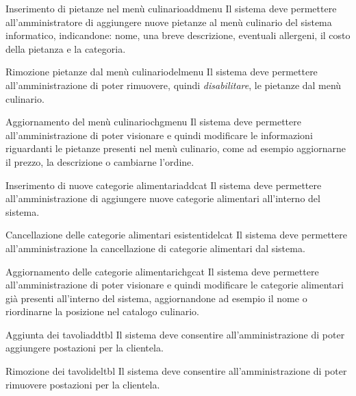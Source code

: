 	\begin{reqfr}{Inserimento di pietanze nel menù culinario}{addmenu}
		Il sistema deve permettere all'amministratore di aggiungere nuove pietanze al menù culinario del sistema informatico, indicandone: nome, una breve descrizione, eventuali allergeni, il costo della pietanza e la categoria.
	\end{reqfr}

	\begin{reqfr}{Rimozione pietanze dal menù culinario}{delmenu}
		Il sistema deve permettere all'amministrazione di poter rimuovere, quindi \textit{disabilitare}, le pietanze dal menù culinario.
	\end{reqfr}

	\begin{reqfr}{Aggiornamento del menù culinario}{chgmenu}
		Il sistema deve permettere all'amministrazione di poter visionare e quindi modificare
		le informazioni riguardanti le pietanze presenti nel menù culinario, come ad esempio aggiornarne
		il prezzo, la descrizione o cambiarne l'ordine.
	\end{reqfr}

	\begin{reqfr}{Inserimento di nuove categorie alimentari}{addcat}
		Il sistema deve permettere all'amministrazione di aggiungere nuove categorie alimentari
		all'interno del sistema.
	\end{reqfr}

	\begin{reqfr}{Cancellazione delle categorie alimentari esistenti}{delcat}
		Il sistema deve permettere all'amministrazione la cancellazione di categorie alimentari dal sistema.
	\end{reqfr}

	\begin{reqfr}{Aggiornamento delle categorie alimentari}{chgcat}
		Il sistema deve permettere all'amministrazione di poter visionare e quindi modificare
		le categorie alimentari già presenti all'interno del sistema, aggiornandone ad esempio
		il nome o riordinarne la posizione nel catalogo culinario.
	\end{reqfr}

	\begin{reqfr}{Aggiunta dei tavoli}{addtbl}
		Il sistema deve consentire all'amministrazione di poter aggiungere postazioni per la clientela.
	\end{reqfr}

	\begin{reqfr}{Rimozione dei tavoli}{deltbl}
		Il sistema deve consentire all'amministrazione di poter rimuovere postazioni per la clientela.
	\end{reqfr}

